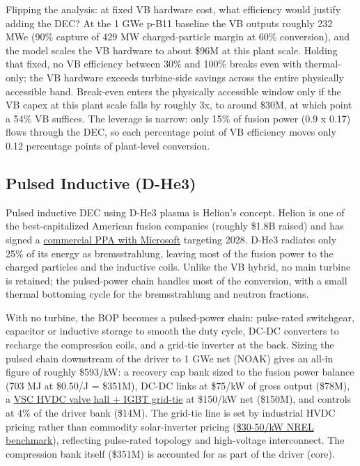 \documentclass{article}
\begin{document}
Flipping the analysis: at fixed VB hardware cost, what efficiency would
justify adding the DEC? At the 1 GWe p-B11 baseline the VB outputs
roughly 232 MWe (90\% capture of 429 MW charged-particle margin at
60\% conversion), and the model scales the VB hardware to about \$96M at
this plant scale. Holding that fixed, no VB efficiency between 30\% and
100\% breaks even with thermal-only; the VB hardware exceeds
turbine-side savings across the entire physically accessible band.
Break-even enters the physically accessible window only if the VB capex
at this plant scale falls by roughly 3x, to around \$30M, at which point
a 54\% VB suffices. The
leverage is narrow: only 15\% of fusion power (0.9 x 0.17) flows through
the DEC, so each percentage point of VB efficiency moves only 0.12
percentage points of plant-level conversion.

\subsection{Pulsed Inductive (D-He3)}\label{pulsed-inductive-d-he3}

Pulsed inductive DEC using D-He3 plasma is Helion's concept. Helion is
one of the best-capitalized American fusion companies (roughly \$1.8B
raised) and has signed a
\href{https://www.microsoft.com/en-us/blog/2023/05/10/microsoft-signs-agreement-with-helion-energy-to-purchase-electricity/}{commercial
PPA with Microsoft} targeting 2028. D-He3 radiates only 25\% of its
energy as bremsstrahlung, leaving most of the fusion power to the
charged particles and the inductive coils. Unlike the VB hybrid, no main
turbine is retained; the pulsed-power chain handles most of the
conversion, with a small thermal bottoming cycle for the bremsstrahlung
and neutron fractions.

With no turbine, the BOP becomes a pulsed-power chain: pulse-rated
switchgear, capacitor or inductive storage to smooth the duty cycle,
DC-DC converters to recharge the compression coils, and a grid-tie
inverter at the back. Sizing the pulsed chain downstream of the driver
to 1 GWe net (NOAK) gives an all-in figure of roughly \$593/kW: a
recovery cap bank sized to the fusion power balance (703 MJ at
\$0.50/J = \$351M), DC-DC links at \$75/kW of gross output (\$78M), a
\href{https://cdn.misoenergy.org/20240501\%20PSC\%20Item\%2004\%20MISO\%20Transmission\%20Cost\%20Estimation\%20Guide\%20for\%20MTEP24632680.pdf}{VSC
HVDC valve hall + IGBT grid-tie} at \$150/kW net (\$150M), and controls
at 4\% of the driver bank (\$14M). The grid-tie line is set by
industrial HVDC pricing rather than commodity solar-inverter pricing
(\href{https://docs.nrel.gov/docs/fy25osti/92536.pdf}{\$30-50/kW NREL
benchmark}), reflecting pulse-rated topology and high-voltage
interconnect. The compression bank itself (\$351M) is accounted for as
part of the driver (core).
\end{document}
